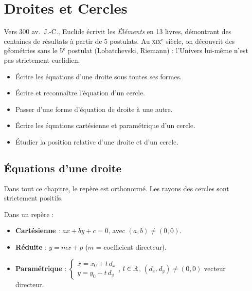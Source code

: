 \chapter{Droites et Cercles}


\begin{anecdote}
Vers $300$ av.\ J.-C., Euclide \'ecrivit les \textit{\'El\'ements} en 13 livres,
d\'emontrant des centaines de r\'esultats \`a partir de 5 postulats. Au
\textsc{xix}$^{\text{e}}$ si\`ecle, on d\'ecouvrit des g\'eom\'etries sans le
5$^{\text{e}}$ postulat (Lobatchevski, Riemann) : l'Univers lui-m\^{e}me
n'est pas strictement euclidien.
\end{anecdote}

\begin{objectifs}
\begin{itemize}
  \item \'Ecrire les \'equations d'une droite sous toutes ses formes.
  \item \'Ecrire et reconna\^itre l'\'equation d'un cercle.
  \item Passer d'une forme d'\'equation de droite \`a une autre.
  \item \'Ecrire les \'equations cart\'esienne et param\'etrique d'un cercle.
  \item \'Etudier la position relative d'une droite et d'un cercle.
\end{itemize}
\end{objectifs}

\section{\'Equations d'une droite}
Dans tout ce chapitre, le rep\`ere est orthonorm\'e.
Les rayons des cercles sont strictement positifs.

\begin{defn}
Dans un rep\`ere :
\begin{itemize}
  \item \textbf{Cart\'esienne} : $ax + by + c = 0$, avec $(a,b)\ne(0,0)$.
  \item \textbf{R\'eduite} : $y = mx + p$ ($m$ = coefficient directeur).
  \item \textbf{Param\'etrique} :
        $\begin{cases}x = x_0 + t\,d_x\\ y = y_0 + t\,d_y\end{cases}$,
        $t\in\mathbb{R}$, $(d_x,d_y)\ne(0,0)$ vecteur directeur.
\end{itemize}
\end{defn}

